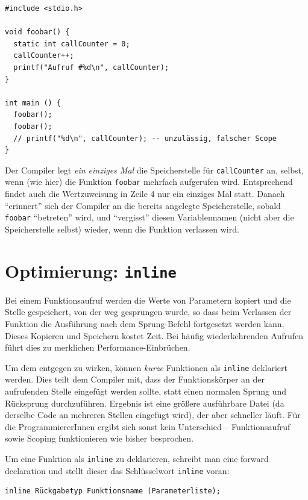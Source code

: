 \begin{codebox}
\begin{verbatim}
#include <stdio.h>

void foobar() {
  static int callCounter = 0;
  callCounter++;
  printf("Aufruf #%d\n", callCounter);
}

int main () {
  foobar();
  foobar();
  // printf("%d\n", callCounter); -- unzulässig, falscher Scope
}
\end{verbatim}
\end{codebox}

Der Compiler legt \emph{ein einziges Mal} die Speicherstelle für \texttt{callCounter} an, selbst, wenn (wie hier) die Funktion \texttt{foobar} mehrfach aufgerufen wird. Entsprechend findet auch die Wertzuweisung in Zeile 4 nur ein einziges Mal statt. Danach \enquote{erinnert} sich der Compiler an die bereits angelegte Speicherstelle, sobald \texttt{foobar} \enquote{betreten} wird, und \enquote{vergisst} diesen Variablennamen (nicht aber die Speicherstelle selbst) wieder, wenn die Funktion verlassen wird.

\section{Optimierung: \texttt{inline}} \label{sec:inline}
Bei einem Funktionsaufruf werden die Werte von Parametern kopiert und die Stelle gespeichert, von der weg gesprungen wurde, so dass beim Verlassen der Funktion die Ausführung nach dem Sprung-Befehl fortgesetzt werden kann. Dieses Kopieren und Speichern kostet Zeit. Bei häufig wiederkehrenden Aufrufen führt dies zu merklichen Performance-Einbrüchen.

Um dem entgegen zu wirken, können \emph{kurze} Funktionen als \texttt{inline} deklariert werden. Dies teilt dem Compiler mit, dass der Funktionskörper an der aufrufenden Stelle eingefügt werden sollte, statt einen normalen Sprung und Rücksprung durchzuführen. Ergebnis ist eine größere ausführbare Datei (da derselbe Code an mehreren Stellen eingefügt wird), der aber schneller läuft. Für die ProgrammiererInnen ergibt sich sonst kein Unterschied -- Funktionsaufruf sowie Scoping funktionieren wie bisher besprochen.

Um eine Funktion als \texttt{inline} zu deklarieren, schreibt man eine forward declaration und stellt dieser das Schlüsselwort \texttt{inline} voran:

\begin{codebox}
\begin{verbatim}
inline Rückgabetyp Funktionsname (Parameterliste);
\end{verbatim}
\end{codebox}

